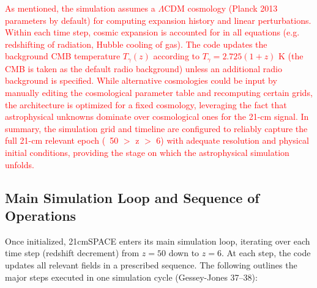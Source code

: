 \documentclass[floats,floatfix,showpacs,amssymb,prd,superscriptaddress,nofootinbib]{revtex4-2} %
\newcommand{\red}{\textcolor{red}}
\begin{document}
\red{As mentioned, the simulation assumes a $\Lambda$CDM cosmology (Planck 2013 parameters by default) for computing expansion history and linear perturbations. Within each time step, cosmic expansion is accounted for in all equations (e.g. redshifting of radiation, Hubble cooling of gas). The code updates the background CMB temperature $T_\gamma(z)$ according to $T_\gamma = 2.725(1+z)$ K (the CMB is taken as the default radio background) unless an additional radio background is specified. While alternative cosmologies could be input by manually editing the cosmological parameter table and recomputing certain grids, the architecture is optimized for a fixed cosmology, leveraging the fact that astrophysical unknowns dominate over cosmological ones for the 21-cm signal. In summary, the simulation grid and timeline are configured to reliably capture the full 21-cm relevant epoch (~50 $\gt$ z $\gt$ 6) with adequate resolution and physical initial conditions, providing the stage on which the astrophysical simulation unfolds.}

\subsection{Main Simulation Loop and Sequence of Operations}

Once initialized, 21cmSPACE enters its main simulation loop, iterating over each time step (redshift decrement) from $z=50$ down to $z=6$. At each step, the code updates all relevant fields in a prescribed sequence. The following outlines the major steps executed in one simulation cycle (Gessey-Jones 37–38):
\end{document}
